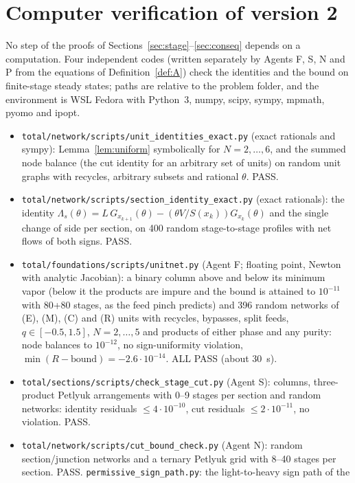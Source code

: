 
\section{Computer verification of version 2}\label{sec:computer2}

No step of the proofs of Sections~\ref{sec:stage}--\ref{sec:conseq} depends on a computation. Four independent codes
(written separately by Agents F, S, N and P from the equations of Definition~\ref{def:A}) check the identities and the
bound on finite-stage steady states; paths are relative to the problem folder, and the environment is WSL Fedora
with Python~3, numpy, scipy, sympy, mpmath, pyomo and ipopt.
\begin{itemize}
\item \texttt{total/network/scripts/unit\_identities\_exact.py} (exact rationals and sympy): Lemma~\ref{lem:uniform}
symbolically for $N=2,\dots,6$, and the summed node balance (the cut identity for an arbitrary set of units) on random
unit graphs with recycles, arbitrary subsets and rational $\theta$. PASS.
\item \texttt{total/network/scripts/section\_identity\_exact.py} (exact rationals): the identity
$\Lambda_s(\theta)=L\,G_{x_{k+1}}(\theta)-(\theta V/S(x_k))G_{x_k}(\theta)$ and the single change of side per section, on 400
random stage-to-stage profiles with net flows of both signs. PASS.
\item \texttt{total/foundations/scripts/unitnet.py} (Agent F; floating point, Newton with analytic Jacobian): a binary
column above and below its minimum vapor (below it the products are impure and the bound is attained to $10^{-11}$
with 80+80 stages, as the feed pinch predicts) and 396 random networks of (E), (M), (C) and (R) units with recycles,
bypasses, split feeds, $q\in[-0.5,1.5]$, $N=2,\dots,5$ and products of either phase and any purity: node balances to
$10^{-12}$, no sign-uniformity violation, $\min(R-\text{bound})=-2.6\cdot10^{-14}$. ALL PASS (about 30~s).
\item \texttt{total/sections/scripts/check\_stage\_cut.py} (Agent S): columns, three-product Petlyuk arrangements with
0--9 stages per section and random networks: identity residuals $\le4\cdot10^{-10}$, cut residuals $\le2\cdot10^{-11}$, no
violation. PASS.
\item \texttt{total/network/scripts/cut\_bound\_check.py} (Agent N): random section/junction networks and a ternary
Petlyuk grid with 8--40 stages per section. PASS. \texttt{permissive\_sign\_path.py}: the light-to-heavy sign path of the

\end{itemize}

